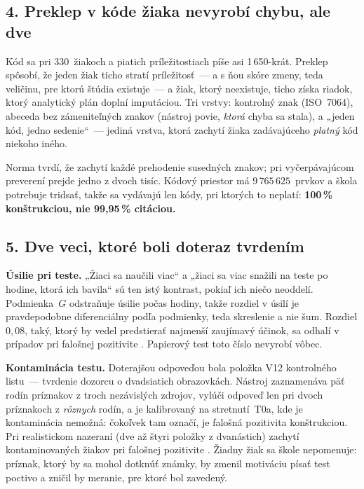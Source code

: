 \documentclass[9.5pt,a4paper]{article}
\begin{document}
\subsection{4. Preklep v kóde žiaka nevyrobí chybu, ale dve}

Kód sa pri 330~žiakoch a piatich príležitostiach píše asi 1\,650-krát. Preklep
spôsobí, že jeden žiak ticho stratí príležitosť~--- a s ňou skóre zmeny, teda
veličinu, pre ktorú štúdia existuje~--- a žiak, ktorý neexistuje, ticho získa
riadok, ktorý analytický plán doplní imputáciou. Tri vrstvy: kontrolný znak
(ISO~7064), abeceda bez zámeniteľných znakov (nástroj povie, \emph{ktorá} chyba
sa stala), a „jeden kód, jedno sedenie“~--- jediná vrstva, ktorá zachytí žiaka
zadávajúceho \emph{platný} kód niekoho iného.

Norma tvrdí, že zachytí každé prehodenie susedných znakov; pri vyčerpávajúcom
preverení prejde jedno z dvoch tisíc. Kódový priestor má $9\,765\,625$~prvkov a
škola potrebuje tridsať, takže sa vydávajú len kódy, pri ktorých to neplatí:
\textbf{100\,\% konštrukciou, nie 99{,}95\,\% citáciou.}

\subsection{5. Dve veci, ktoré boli doteraz tvrdením}

\textbf{Úsilie pri teste.} „Žiaci sa naučili viac“ a „žiaci sa viac snažili na
teste po hodine, ktorá ich bavila“ sú ten istý kontrast, pokiaľ ich niečo
neoddelí. Podmienka~$G$ odstraňuje úsilie počas hodiny, takže rozdiel v úsilí je
pravdepodobne diferenciálny podľa podmienky, teda skreslenie a nie šum. Rozdiel
$0{,}08$, taký, ktorý by vedel predstierať najmenší zaujímavý účinok, sa odhalí
v \asmEffortDetect{} prípadov pri falošnej pozitivite \asmEffortFalsePos{}.
Papierový test toto číslo nevyrobí vôbec.

\textbf{Kontaminácia testu.} Doterajšou odpoveďou bola položka V12 kontrolného
listu~--- tvrdenie dozorcu o dvadsiatich obrazovkách. Nástroj zaznamenáva päť
rodín príznakov z troch nezávislých zdrojov, vylúči odpoveď len pri dvoch
príznakoch z \emph{rôznych} rodín, a je kalibrovaný na stretnutí~T0a, kde je
kontaminácia nemožná: čokoľvek tam označí, je falošná pozitivita konštrukciou.
Pri realistickom nazeraní (dve až štyri položky z dvanástich) zachytí
\asmIntegDetect{} kontaminovaných žiakov pri falošnej pozitivite
\asmIntegFalsePos{}. Žiadny žiak sa škole nepomenuje: príznak, ktorý by sa mohol
dotknúť známky, by zmenil motiváciu písať test poctivo a zničil by meranie, pre
ktoré bol zavedený.
\end{document}
